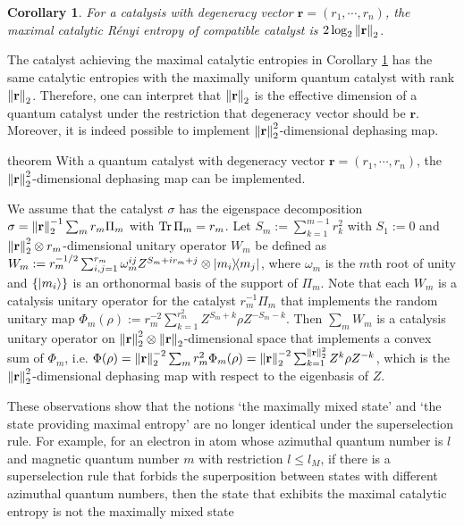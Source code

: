 \documentclass[aps, reprint, amsmath,amssymb, prx, superscriptaddress]{revtex4-2}
\newtheorem{corollary}[theorem]{Corollary}
\begin{document}
\begin{corollary} \label{coro:vector}
    For a catalysis with degeneracy vector $\textbf{r}=(r_1,\cdots,r_n)$, the maximal catalytic R\'{e}nyi entropy of compatible catalyst is $2\log_2 \norm{\textbf{r}}_2$.
\end{corollary}
 
 The catalyst achieving the maximal catalytic entropies in Corollary \ref{coro:vector} has the same catalytic entropies with the maximally uniform quantum catalyst with rank $\norm{\textbf{r}}_2$. Therefore, one can interpret that $\norm{\textbf{r}}_2$ is the effective dimension of a quantum catalyst under the restriction that degeneracy vector should be $\textbf{r}.$ Moreover, it is indeed possible to implement $\norm{\textbf{r}}_2^2$-dimensional dephasing map.

\begin{theoremEnd}{theorem}
   With a quantum catalyst with degeneracy vector $\textbf{r}=(r_1,\cdots,r_n)$, the $\norm{\textbf{r}}_2^2$-dimensional dephasing map can be implemented.
\end{theoremEnd}
\begin{proofEnd}
    We assume that the catalyst $\sigma$ has the eigenspace decomposition $\sigma=\norm{\textbf{r}}_2^{-1}\sum_m r_m \Pi_m$ with $\Tr \Pi_m = r_m$. Let $S_m:=\sum_{k=1}^{m-1}r_k^2$ with $S_1:=0$ and $\norm{\textbf{r}}_2^2\otimes r_m$-dimensional unitary operator $W_m$ be defined as $W_m := r_m^{-1/2} \sum_{i,j=1}^{r_m} \omega_m^{ij} Z^{S_m+ir_m+j}\otimes \dyad{m_i}{m_j}$, where $\omega_m$ is the $m$th root of unity and $\{\ket{m_i}\}$ is an orthonormal basis of the support of $\Pi_m$. Note that each $W_m$ is a catalysis unitary operator for the catalyst $r_m^{-1}\Pi_m$ that implements the random unitary map $\Phi_m(\rho):= r_m^{-2}\sum_{k=1}^{r_m^2} Z^{S_m+k}\rho Z^{-S_m-k}$. Then $\sum_m W_m$ is a catalysis unitary operator on $\norm{\textbf{r}}_2^2 \otimes \norm{\textbf{r}}_2$-dimensional space that implements a convex sum of $\Phi_m$, i.e. $\Phi(\rho)=\norm{\textbf{r}}_2^{-2}\sum_m r_m^2 \Phi_m(\rho)=\norm{\textbf{r}}_2^{-2}\sum_{k=1}^{\norm{\textbf{r}}_2^2} Z^k\rho Z^{-k}$, which is the $\norm{\textbf{r}}_2^2$-dimensional dephasing map with respect to the eigenbasis of $Z$.
\end{proofEnd}
These observations show that the notions `the maximally mixed state' and `the state providing maximal entropy' are no longer identical under the superselection rule. For example, for an electron in atom whose azimuthal quantum number is $l$ and magnetic quantum number $m$ with restriction $l\leq l_M$, if there is a superselection rule that forbids the superposition between states with different azimuthal quantum numbers, then the state that exhibits the maximal catalytic entropy is not the maximally mixed state 
\end{document}
